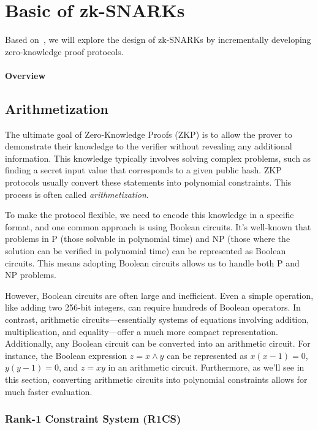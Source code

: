 \documentclass{article}
\begin{document}
\section{Basic of zk-SNARKs}

Based on~\cite{petkus2019and}, we will explore the design of zk-SNARKs by incrementally developing zero-knowledge proof protocols.

\paragraph{Overview}

\subsection{Arithmetization}

The ultimate goal of Zero-Knowledge Proofs (ZKP) is to allow the prover to demonstrate their knowledge to the verifier without revealing any additional information. This knowledge typically involves solving complex problems, such as finding a secret input value that corresponds to a given public hash. ZKP protocols usually convert these statements into polynomial constraints. This process is often called \textit{arithmetization}.

To make the protocol flexible, we need to encode this knowledge in a specific format, and one common approach is using Boolean circuits. It's well-known that problems in P (those solvable in polynomial time) and NP (those where the solution can be verified in polynomial time) can be represented as Boolean circuits. This means adopting Boolean circuits allows us to handle both P and NP problems.

However, Boolean circuits are often large and inefficient. Even a simple operation, like adding two 256-bit integers, can require hundreds of Boolean operators. In contrast, arithmetic circuits—essentially systems of equations involving addition, multiplication, and equality—offer a much more compact representation. Additionally, any Boolean circuit can be converted into an arithmetic circuit. For instance, the Boolean expression $z = x \land y$ can be represented as $x(x-1) = 0$, $y(y-1) = 0$, and $z = xy$ in an arithmetic circuit. Furthermore, as we'll see in this section, converting arithmetic circuits into polynomial constraints allows for much faster evaluation.

\subsubsection{Rank-1 Constraint System (R1CS)}
\end{document}
